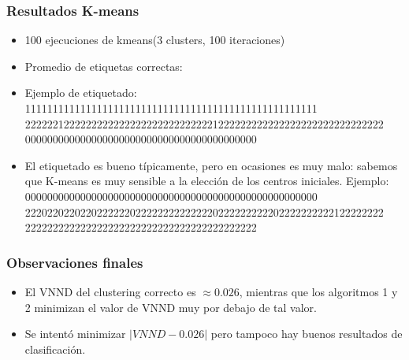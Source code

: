 \documentclass[11pt]{beamer}
\begin{document}
        \begin{frame}
        \frametitle{Resultados K-means}
    \begin{itemize}
        \item 100 ejecuciones de kmeans(3 clusters, 100 iteraciones)
        \item Promedio de etiquetas correctas: 
        \item Ejemplo de etiquetado: 
            {\scriptsize 11111111111111111111111111111111111111111111111111111
            22222212222222222222222222222222221222222222222222222222222222222
                000000000000000000000000000000000000000000}
        \item El etiquetado es bueno típicamente, pero en ocasiones es muy malo: sabemos que K-means es muy sensible a la elección de 
            los centros iniciales. Ejemplo:\\ 
            {\scriptsize  00000000000000000000000000000000000000000000000000000
                22202202202202222220222222222222220222222222202222222222122222222
                222222222222222222222222222222222222222222}
    \end{itemize}
\end{frame}
%
    \begin{frame}
        \frametitle{Observaciones finales}
        \begin{itemize}
            \item El VNND del clustering correcto es $\approx0.026$, mientras que los algoritmos 1 y 2 minimizan el
                valor de VNND muy por debajo de tal valor. 
            \item Se intentó minimizar $|VNND-0.026|$ pero tampoco hay buenos resultados de clasificación.
        \end{itemize}
    \end{frame}
\end{document}
